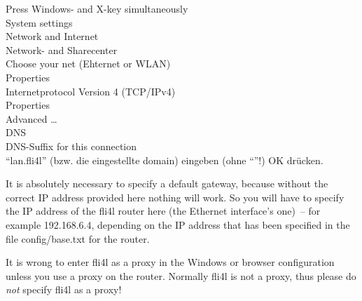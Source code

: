   \noindent Press Windows- and X-key simultaneously \pfeil\\
  \hspace*{2ex}System settings \pfeil\\
  \hspace*{4ex}Network and Internet \pfeil\\
  \hspace*{6ex}Network- and Sharecenter \pfeil\\
  \hspace*{8ex}Choose your net (Ehternet or WLAN) \pfeil\\
  \hspace*{10ex}Properties \pfeil\\
  \hspace*{12ex}Internetprotocol Version 4 (TCP/IPv4) \pfeil\\
  \hspace*{14ex}Properties \pfeil\\
  \hspace*{16ex}Advanced \ldots \pfeil\\
  \hspace*{18ex}DNS \pfeil\\
  \hspace*{20ex}DNS-Suffix for this connection \pfeil\\

  ``lan.fli4l'' (bzw. die eingestellte domain) eingeben (ohne ``''!)
  \pfeil OK drücken.

  It is absolutely necessary to specify a default gateway, because without
  the correct IP address provided here nothing will work.
  So you will have to specify the IP address of the fli4l router here (the
  Ethernet interface's one)~-- for example 192.168.6.4, depending on the IP address
  that has been specified in the file config/base.txt for the router.

  It is wrong to enter fli4l as a proxy in the Windows or browser configuration
  unless you use a proxy on the router. Normally fli4l is not a proxy, thus
  please do \emph{not} specify fli4l as a proxy!


